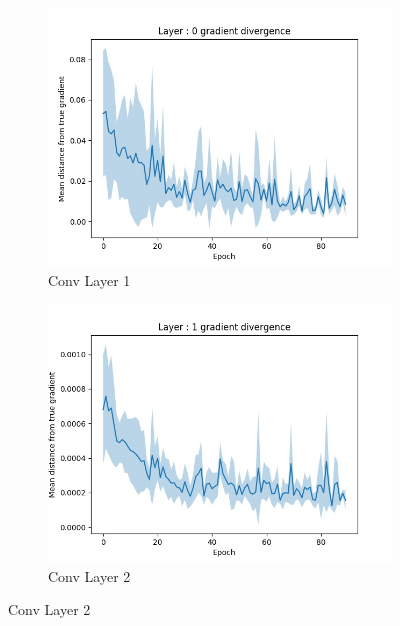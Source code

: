  \begin{figure}
        \centering
        \begin{subfigure}[b]{0.475\textwidth}
            \centering
            \includegraphics[width=\textwidth]{chapter_6_figures/cnn_weight_diff_0.jpg}
            \caption[Network2]%
            {{\small Conv Layer 1}}    
        \end{subfigure}
        \hfill
        \begin{subfigure}[b]{0.475\textwidth}  
            \centering 
            \includegraphics[width=\textwidth]{chapter_6_figures/cnn_weight_diff_1.jpg}
            \caption[]%
            {{\small Conv Layer 2}}    
        \end{subfigure}

\end{figure}
